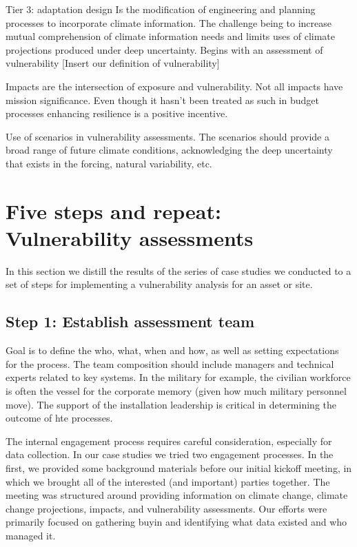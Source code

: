 \documentclass[10pt]{amsart}
\begin{document}
Tier 3: adaptation design
Is the modification of engineering and planning processes to incorporate climate information.
The challenge being to increase mutual comprehension of climate information needs and limits uses of climate projections produced under 
deep uncertainty.
Begins with an assessment of vulnerability 
[Insert our definition of vulnerability]

Impacts are the intersection of exposure and vulnerability.
Not all impacts have mission significance. 
Even though it hasn't been treated as such in budget processes enhancing resilience is a positive incentive.

Use of scenarios in vulnerability assessments.
The scenarios should provide a broad range of future climate conditions, acknowledging the deep uncertainty that exists in the forcing, natural variability, etc. 

\section{Five steps and repeat: Vulnerability assessments}
In this section we distill the results of the series of case studies we conducted to a set of steps for implementing a vulnerability analysis for an asset or site. 

\subsection{Step 1: Establish assessment team}
Goal is to define the who, what, when and how, as well as setting expectations for the process.
The team composition should include managers and technical experts related to key systems.
In the military for example, the civilian workforce is often the vessel for the corporate memory (given how much military personnel move).
The support of the installation leadership is critical in determining the outcome of hte processes. 

The internal engagement process requires careful consideration, especially for data collection.
In our case studies we tried two engagement processes.
In the first, we provided some background materials before our initial kickoff meeting, in which we brought all of the interested (and important) parties together.
The meeting was structured around providing information on climate change, climate change projections, impacts, and vulnerability assessments.
Our efforts were primarily focused on gathering buyin and identifying what data existed and who managed it. 
\end{document}

